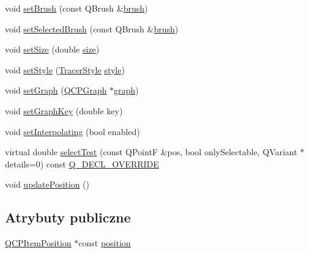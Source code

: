 \begin{DoxyCompactItemize}
void \hyperlink{class_q_c_p_item_tracer_a2c303f7470a30084daa201ed556b3c36}{set\+Brush} (const Q\+Brush \&\hyperlink{class_q_c_p_item_tracer_af07527750cfb6afc3c0ba4bec012011f}{brush})
\item 
void \hyperlink{class_q_c_p_item_tracer_a0f55c084980a7a312af859d3e7b558ef}{set\+Selected\+Brush} (const Q\+Brush \&\hyperlink{class_q_c_p_item_tracer_af07527750cfb6afc3c0ba4bec012011f}{brush})
\item 
void \hyperlink{class_q_c_p_item_tracer_ae47fe0617f5fef5fdb766999569be10a}{set\+Size} (double \hyperlink{class_q_c_p_item_tracer_a2607fcb3d01e90773ea1532fd6803760}{size})
\item 
void \hyperlink{class_q_c_p_item_tracer_a41a2ac4f1acd7897b4e2a2579c03204e}{set\+Style} (\hyperlink{class_q_c_p_item_tracer_a2f05ddb13978036f902ca3ab47076500}{Tracer\+Style} \hyperlink{class_q_c_p_item_tracer_a871832dace1709f877c3136fac7ae1ec}{style})
\item 
void \hyperlink{class_q_c_p_item_tracer_af5886f4ded8dd68cb4f3388f390790c0}{set\+Graph} (\hyperlink{class_q_c_p_graph}{Q\+C\+P\+Graph} $\ast$\hyperlink{class_q_c_p_item_tracer_a74c90da0e6730839b8d7cf6445a4ec1f}{graph})
\item 
void \hyperlink{class_q_c_p_item_tracer_a6840143b42f3b685cedf7c6d83a704c8}{set\+Graph\+Key} (double key)
\item 
void \hyperlink{class_q_c_p_item_tracer_a6c244a9d1175bef12b50afafd4f5fcd2}{set\+Interpolating} (bool enabled)
\item 
virtual double \hyperlink{class_q_c_p_item_tracer_a9fd955fea40e977d66f3a9fd5765aec4}{select\+Test} (const Q\+PointF \&pos, bool only\+Selectable, Q\+Variant $\ast$details=0) const \hyperlink{qcustomplot_8hh_a42cc5eaeb25b85f8b52d2a4b94c56f55}{Q\+\_\+\+D\+E\+C\+L\+\_\+\+O\+V\+E\+R\+R\+I\+DE}
\item 
void \hyperlink{class_q_c_p_item_tracer_a5b90296109e36384aedbc8908a670413}{update\+Position} ()
\end{DoxyCompactItemize}
\subsection*{Atrybuty publiczne}
\begin{DoxyCompactItemize}
\item 
\hyperlink{class_q_c_p_item_position}{Q\+C\+P\+Item\+Position} $\ast$const \hyperlink{class_q_c_p_item_tracer_a69917e2fdb2b3a929c196958feee7cbe}{position}
\end{DoxyCompactItemize}
